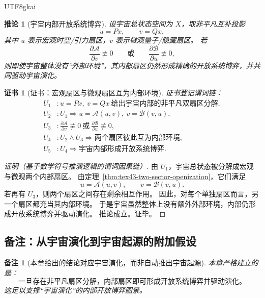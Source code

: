 \documentclass[12pt]{article}
\newtheorem{corollary}{推论}[section]
\newtheorem{remark}{备注}[section]
\newtheorem{Certificate}{证书}[section]
\begin{document}
\begin{CJK*}{UTF8}{gkai}
\begin{corollary}[宇宙内部开放系统博弈]
\label{cor:tex43-universe-open-game}
设宇宙总状态空间为 $X$，取非平凡互补投影
\[
  u=Px,
  \qquad
  v=Qx,
\]
其中 $u$ 表示宏观时空/引力扇区，$v$ 表示微观量子/隐藏扇区。
若
\[
  \frac{\partial \mathcal A}{\partial v}\not\equiv 0
  \qquad\text{或}\qquad
  \frac{\partial \mathcal B}{\partial u}\not\equiv 0,
\]
则即使宇宙整体没有“外部环境”，其内部扇区仍然形成精确的开放系统博弈，并共同驱动宇宙演化。
\end{corollary}

\begin{Certificate}[证书：宏观扇区与微观扇区互为内部环境]
\label{cert:tex43-universe-open-game}
证书登记谓词链：
\[
\begin{aligned}
  U_1 &: u=Px,\ v=Qx\ \text{给出宇宙内部的非平凡双扇区分解},\\
  U_2 &: U_1 \Rightarrow \dot u=\mathcal A(u,v),\ \dot v=\mathcal B(v,u),\\
  U_3 &: \frac{\partial \mathcal A}{\partial v}\not\equiv 0\ \text{或}\ \frac{\partial \mathcal B}{\partial u}\not\equiv
    0,\\
  U_4 &: U_2\wedge U_3 \Rightarrow \text{两个扇区彼此互为内部环境},\\
  U_5 &: U_4 \Rightarrow \text{宇宙内部形成开放系统博弈}.
\end{aligned}
\]
\end{Certificate}

\begin{proof}[证明（基于数学符号推演逻辑的谓词因果链）]
由 $U_1$，宇宙总状态被分解成宏观与微观两个内部扇区。
由定理~\ref{thm:tex43-two-sector-openization}，它们满足
\[
  \dot u=\mathcal A(u,v),
  \qquad
  \dot v=\mathcal B(v,u).
\]
若再有 $U_3$，则两个扇区之间存在剩余相互作用。
因此，对每个单独扇区而言，另一个扇区都充当其内部环境。
于是宇宙虽然整体上没有额外外部环境，内部仍形成开放系统博弈并驱动演化。
推论成立。证毕。
\end{proof}

\subsection{备注：从宇宙演化到宇宙起源的附加假设}
\label{subsec:tex43-ch3-remarks}

\begin{remark}[本章给出的结论对应宇宙演化，而非自动推出宇宙起源]
本章严格建立的是：
\[
  \text{一旦存在非平凡扇区分解，内部扇区即可形成开放系统博弈并驱动演化。}
\]
这足以支撑“宇宙演化”的内部开放博弈图景。
\end{remark}


\end{CJK*}
\end{document}
